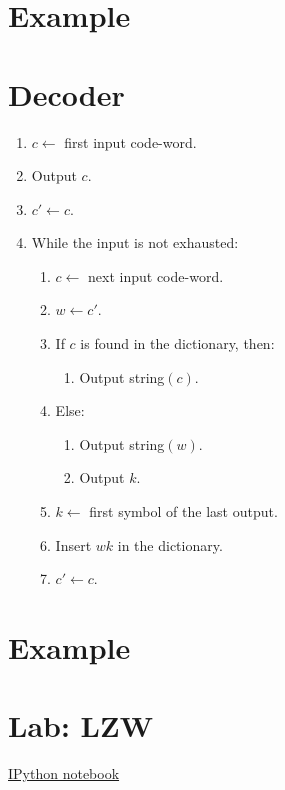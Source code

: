\section*{Example}

\section{Decoder}

\begin{enumerate}
\tightlist
\item
  \(c\leftarrow\) first input code-word.
\item
  Output \(c\).
\item
  \(c'\leftarrow c\).
\item
  While the input is not exhausted:
  \begin{enumerate}
  \tightlist
  \item
    \(c\leftarrow\) next input code-word.
  \item
    \(w\leftarrow c'\).
  \item
    If \(c\) is found in the dictionary, then:
    \begin{enumerate}
    \tightlist
    \item
      Output string\((c)\).
    \end{enumerate}
  \item
    Else:
    \begin{enumerate}
    \tightlist
    \item
      Output string\((w)\).
    \item
      Output \(k\).
    \end{enumerate}
  \item
    \(k\leftarrow\) first symbol of the last output.
  \item
    Insert \(wk\) in the dictionary.
  \item
    \(c'\leftarrow c\).
  \end{enumerate}
\end{enumerate}

\section*{Example}

\section{Lab: LZW}
\href{https://nbviewer.jupyter.org/github/vicente-gonzalez-ruiz/LZW/blob/master/LZW.ipynb}{IPython notebook}


